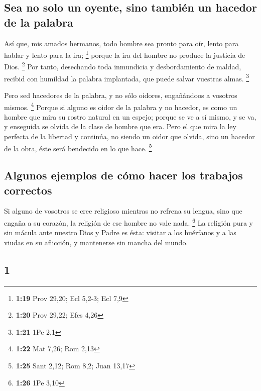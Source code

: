 \begin{paracol}{2}
\hypertarget{sea-no-solo-un-oyente-sino-tambiuxe9n-un-hacedor-de-la-palabra}{%
\subsection{Sea no solo un oyente, sino también un hacedor de la
palabra}\label{sea-no-solo-un-oyente-sino-tambiuxe9n-un-hacedor-de-la-palabra}}

 Así que, mis amados hermanos, todo hombre sea pronto
para oír, lento para hablar y lento para la ira; \footnote{\textbf{1:19}
  Prov 29,20; Ecl 5,2-3; Ecl 7,9}  porque la ira del
hombre no produce la justicia de Dios. \footnote{\textbf{1:20} Prov
  29,22; Efes 4,26}  Por tanto, desechando toda
inmundicia y desbordamiento de maldad, recibid con humildad la palabra
implantada, que puede salvar vuestras almas. \footnote{\textbf{1:21} 1Pe
  2,1}

 Pero sed hacedores de la palabra, y no sólo oidores,
engañándoos a vosotros mismos. \footnote{\textbf{1:22} Mat 7,26; Rom
  2,13}  Porque si alguno es oidor de la palabra y no
hacedor, es como un hombre que mira su rostro natural en un espejo;
 porque se ve a sí mismo, y se va, y enseguida se olvida
de la clase de hombre que era.  Pero el que mira la ley
perfecta de la libertad y continúa, no siendo un oidor que olvida, sino
un hacedor de la obra, éste será bendecido en lo que hace. \footnote{\textbf{1:25}
  Sant 2,12; Rom 8,2; Juan 13,17}

\hypertarget{algunos-ejemplos-de-cuxf3mo-hacer-los-trabajos-correctos}{%
\subsection{Algunos ejemplos de cómo hacer los trabajos
correctos}\label{algunos-ejemplos-de-cuxf3mo-hacer-los-trabajos-correctos}}

 Si alguno de vosotros se cree religioso mientras no
refrena su lengua, sino que engaña a su corazón, la religión de ese
hombre no vale nada. \footnote{\textbf{1:26} 1Pe 3,10} 
La religión pura y sin mácula ante nuestro Dios y Padre es ésta: visitar
a los huérfanos y a las viudas en su aflicción, y mantenerse sin mancha
del mundo.

\switchcolumn
\begin{otherlanguage}{english}

\hypertarget{section-1}{%
\section{1}\label{section-1}}


\end{otherlanguage}
\end{paracol}
